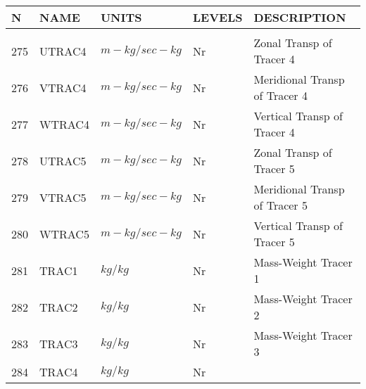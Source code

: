 \newpage
\vspace*{\fill}
\begin{tabular}{lllll}
\hline\hline
N & NAME & UNITS & LEVELS & DESCRIPTION \\
\hline

&\\
275& UTRAC4   & $m-kg/sec-kg$ & Nr
         &\begin{minipage}[t]{3in}
          {Zonal Transp of Tracer 4} 
         \end{minipage}\\
276& VTRAC4   & $m-kg/sec-kg$ & Nr
         &\begin{minipage}[t]{3in}
          {Meridional Transp of Tracer 4} 
         \end{minipage}\\
277& WTRAC4   & $m-kg/sec-kg$ & Nr
         &\begin{minipage}[t]{3in}
          {Vertical Transp of Tracer 4} 
         \end{minipage}\\
278& UTRAC5   & $m-kg/sec-kg$ & Nr
         &\begin{minipage}[t]{3in}
          {Zonal Transp of Tracer 5} 
         \end{minipage}\\
279& VTRAC5   & $m-kg/sec-kg$ & Nr
         &\begin{minipage}[t]{3in}
          {Meridional Transp of Tracer 5} 
         \end{minipage}\\
280& WTRAC5   & $m-kg/sec-kg$ & Nr
         &\begin{minipage}[t]{3in}
          {Vertical Transp of Tracer 5} 
         \end{minipage}\\
281& TRAC1    & $kg/kg$ & Nr
         &\begin{minipage}[t]{3in}
          {Mass-Weight Tracer 1} 
         \end{minipage}\\
282& TRAC2    & $kg/kg$ & Nr
         &\begin{minipage}[t]{3in}
          {Mass-Weight Tracer 2} 
         \end{minipage}\\
283& TRAC3    & $kg/kg$ & Nr
         &\begin{minipage}[t]{3in}
          {Mass-Weight Tracer 3} 
         \end{minipage}\\
284& TRAC4    & $kg/kg$ & Nr

\end{tabular}
